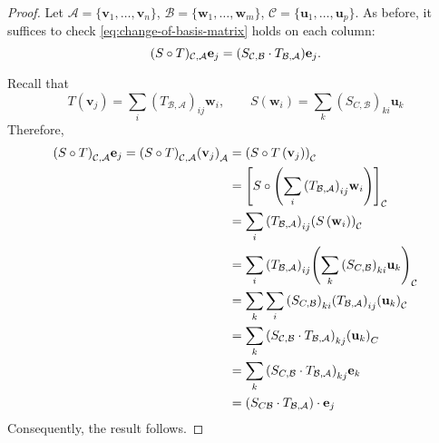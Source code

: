 \begin{proof}
Let \( \mathcal{A} = \{ \mathbf{v}_1, \ldots, \mathbf{v}_n \} \), \( \mathcal{B} = \{ \mathbf{w}_1, \ldots, \mathbf{w}_m \} \), \( \mathcal{C} = \{ \mathbf{u}_1, \ldots, \mathbf{u}_p \} \). As before, it suffices to check \eqref{eq:change-of-basis-matrix} holds on each column:
$$(S \circ T)_{\mathcal{C}, \mathcal{A}}{\bf e}_j = (S_{\mathcal{C}, \mathcal{B}} \cdot T_{\mathcal{B}, \mathcal{A}}){\bf e}_j.$$

Recall that 
\[
T\left( {\mathbf{v}}_{j}\right)  = \mathop{\sum }\limits_{i}{\left( {T}_{\mathcal{B},\mathcal{A}}\right) }_{ij}{\mathbf{w}}_{i}, \quad \quad S\left( {\mathbf{w}}_{i}\right)  = \mathop{\sum }\limits_{k}{\left( {S}_{C,\mathcal{B}}\right) }_{ki}{\mathbf{u}}_{k}
\]
Therefore,
\begin{align*}
{\left( S \circ  T\right) }_{\mathcal{C},\mathcal{A}}\mathbf{e}_{j}={\left( S \circ  T\right) }_{\mathcal{C},\mathcal{A}}{\left( {\mathbf{v}}_{j}\right) }_{\mathcal{A}} &= {\left( S \circ  T\left( {\mathbf{v}}_{j}\right) \right) }_{\mathcal{C}}\\
&= {\left\lbrack  S \circ  \left( \mathop{\sum }\limits_{i}{\left( {T}_{\mathcal{B},\mathcal{A}}\right) }_{ij}{\bf w}_{i}\right) \right\rbrack  }_{\mathcal{C}}\\
&= \mathop{\sum }\limits_{i}{\left( {T}_{\mathcal{B},\mathcal{A}}\right) }_{ij}{\left( S\left( {\bf w}_{i}\right) \right) }_{\mathcal{C}} \\
&= \mathop{\sum }\limits_{i}{\left( {T}_{\mathcal{B},\mathcal{A}}\right) }_{ij}{\left( \mathop{\sum }\limits_{k}{\left( {S}_{C,\mathcal{B}}\right) }_{ki}{\bf u}_{k}\right) }_{\mathcal{C}} \\
&= \mathop{\sum }\limits_{k}\mathop{\sum }\limits_{i}{\left( {S}_{C,\mathcal{B}}\right) }_{ki}{\left( {T}_{\mathcal{B},\mathcal{A}}\right) }_{ij}{\left( {\mathbf{u}}_{k}\right) }_{\mathcal{C}} \\
&= \mathop{\sum }\limits_{k}{\left( {S}_{\mathcal{C},\mathcal{B}}\cdot{T}_{\mathcal{B},\mathcal{A}}\right) }_{kj}{\left( {\mathbf{u}}_{k}\right) }_{C} \\
&= \mathop{\sum }\limits_{k}{\left( {S}_{C,\mathcal{B}}\cdot{T}_{\mathcal{B},\mathcal{A}}\right) }_{kj}{\mathbf{e}}_{k} \\ 
&=({S}_{C\mathcal{B}}\cdot{T}_{\mathcal{B},\mathcal{A}})\cdot {\bf e}_j
\end{align*}
Consequently, the result follows.
\end{proof}


